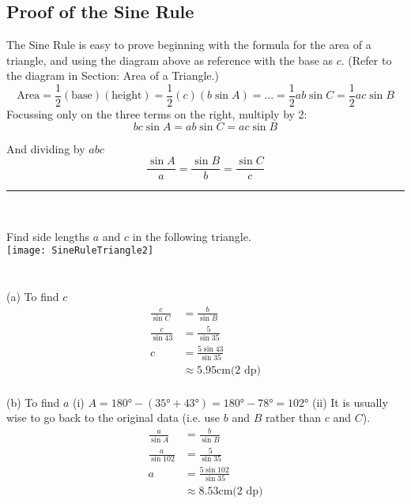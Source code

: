 \subsection*{Proof of the Sine Rule}
The Sine Rule is easy to prove beginning with the formula for the area of a triangle, and using the diagram above as reference with the base as $c$. (Refer to the diagram in Section: Area of a Triangle.)
\begin{equation*}\text{Area} =\frac{1}{2}(\text{base})(\text{height})=\frac{1}{2} (c)(b\sin A)=\dots=\frac{1}{2}ab\sin C=\frac{1}{2}ac\sin B
\end{equation*}
Focussing only on the three terms on the right, multiply by 2:
\begin{equation*}b c \sin  A=ab\sin C=ac\sin B
\end{equation*}

And dividing by $a b c$
\begin{equation*}\frac{\sin A}{a}=\frac{\sin B}{b}=\frac{\sin C}{c}
\end{equation*}
\rule{\textwidth}{0.5pt}\\
\begin{multicols}{2}
\example Find side lengths $a$ and $c$ in the following triangle.\\
\texttt{[image: SineRuleTriangle2]}\\
$\phantom{1}$\\
$\phantom{1}$\\
\solution \medskip\\(a) To find $c$
\begin{align*}\frac{c}{\sin  C} &  = \frac{b}{\sin  B} \\
\frac{c}{\sin  43 } &  = \frac{5}{\sin  35 } \\
c &  = \frac{5 \sin  43 }{\sin  35 } \\
&  \approx   5.95 \mbox{cm}\text{(2 dp)}\end{align*} \\
\clearpage
(b) To find $a$ (i) $A =\ang{180}  -(\ang{35}  +\ang{43} ) =\ang{180}  -\ang{78}  =\ang{102}$ (ii) It is usually wise to go back to the original data (i.e. use $b$ and $B$ rather than $c$ and $C$).
\begin{align*}\frac{a}{\sin  A} &  = \frac{b}{\sin  B} \\
\frac{a}{\sin  102 } &  = \frac{5}{\sin  35 } \\
a &  = \frac{5 \sin  102 }{\sin  35 } \\
&  \approx   8.53 \mbox{cm}\text{(2 dp)}\end{align*}
\end{multicols}

